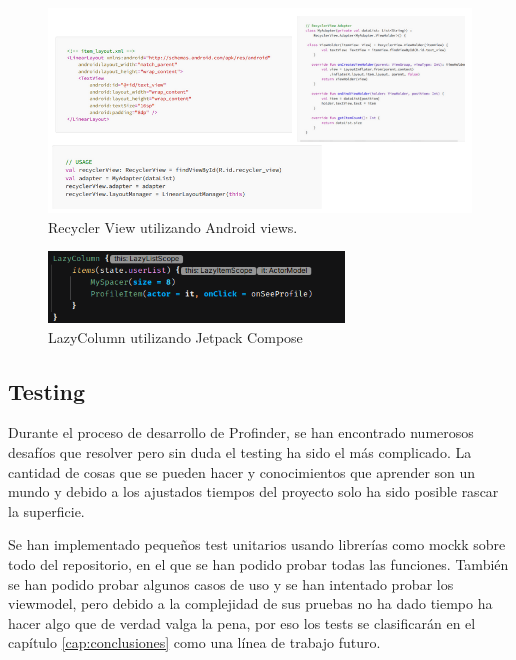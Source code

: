 \begin{figure}[h]
	\centering
	\includegraphics[width = 1\textwidth]{Imagenes/Fuentes/views_demo.png}
	\caption{Recycler View utilizando Android views.}
	\label{fig:views_demo}
\end{figure}
\newpage
\begin{figure}[h]
	\centering
	\includegraphics[width = 0.7\textwidth]{Imagenes/Fuentes/compose_demo.png}
	\caption{LazyColumn utilizando Jetpack Compose}
	\label{fig:compose_demo}
\end{figure}

\subsection{Testing}
\label{subsec:testing}
Durante el proceso de desarrollo de Profinder, se han encontrado numerosos desafíos que resolver pero sin duda el testing ha sido el más complicado. La cantidad de cosas que se pueden hacer y conocimientos que aprender son un mundo y debido a los ajustados tiempos del proyecto solo ha sido posible rascar la superficie.

Se han implementado pequeños test unitarios usando librerías como mockk\hyperlink{cap:biblio}{} sobre todo del repositorio, en el que se han podido probar todas las funciones. También se han podido probar algunos casos de uso y se han intentado probar los viewmodel, pero debido a la complejidad de sus pruebas no ha dado tiempo ha hacer algo que de verdad valga la pena, por eso los tests se clasificarán en el capítulo \ref{cap:conclusiones} como una línea de trabajo futuro.


